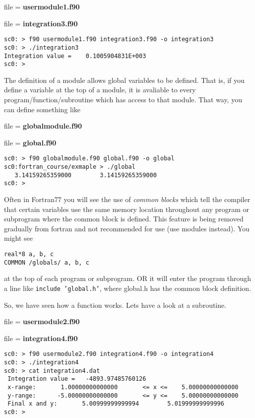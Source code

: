 \documentclass[12pt,a4paper,oneside,openany]{report}
\newcommand{\fcode}[1]{\par file = \textbf{#1} }
\newcommand{\code}[1]{\texttt{#1}}
\begin{document}
\newpage

\fcode{usermodule1.f90}

\newpage

\fcode{integration3.f90}

\newpage

\begin{verbatim}
sc0: > f90 usermodule1.f90 integration3.f90 -o integration3
sc0: > ./integration3
Integration value =    0.1005904831E+003
sc0: >
\end{verbatim}

The definition of a module allows global variables to be defined.  That is, if you define a variable at the top of a module, it is avaliable to every program/function/subroutine which has access to that module.  That way, you can define something like
\fcode{globalmodule.f90}
\fcode{global.f90}

\newpage

\begin{verbatim}
sc0: > f90 globalmodule.f90 global.f90 -o global
sc0:fortran_course/exmaple > ./global
   3.14159265359000        3.14159265359000
sc0: >
\end{verbatim}

Often in Fortran77 you will see the use of \textit{common blocks} which tell the compiler that certain variables use the same memory location throughout any program or subprogram where the common block is defined.  This feature is being removed gradually from fortran and not recommended for use (use modules instead).  You might see
\begin{verbatim}
real*8 a, b, c
COMMON /globals/ a, b, c
\end{verbatim}
at the top of each program or subprogram.  OR it will enter the program through a line like \code{include 'global.h'}, where global.h has the common block definition.

\newpage

So, we have seen how a function works.  Lets have a look at a subroutine.
\fcode{usermodule2.f90}
\fcode{integration4.f90}

\begin{verbatim}
sc0: > f90 usermodule2.f90 integration4.f90 -o integration4
sc0: > ./integration4
sc0: > cat integration4.dat
 Integration value =   -4893.97485760126     
 x-range:       1.00000000000000       <= x <=    5.00000000000000     
 y-range:      -5.00000000000000       <= y <=    5.00000000000000     
 Final x and y:       5.00999999999994        5.01999999999996     
sc0: >
\end{verbatim}
\end{document}

